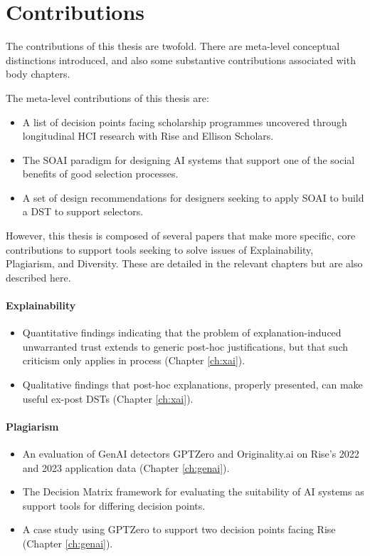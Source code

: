 \section{Contributions} 
The contributions of this thesis are twofold. There are meta-level conceptual distinctions introduced, and also some substantive contributions associated with body chapters.

The meta-level contributions of this thesis are:

\begin{itemize}
    \item A list of decision points facing scholarship programmes uncovered through longitudinal HCI research with Rise and Ellison Scholars.
    \item The SOAI paradigm for designing AI systems that support one of the social benefits of good selection processes.
    \item A set of design recommendations for designers seeking to apply SOAI to build a DST to support selectors.
\end{itemize}

However, this thesis is composed of several papers that make more specific, core contributions to support tools seeking to solve issues of Explainability, Plagiarism, and Diversity. These are detailed in the relevant chapters but are also described here.

\paragraph{Explainability}
\begin{itemize}
    \item Quantitative findings indicating that the problem of explanation-induced unwarranted trust extends to generic post-hoc justifications, but that such criticism only applies in process (Chapter \ref{ch:xai}).
    \item Qualitative findings that post-hoc explanations, properly presented, can make useful ex-post DSTs (Chapter \ref{ch:xai}).
\end{itemize}

\paragraph{Plagiarism}
\begin{itemize}
    \item An evaluation of GenAI detectors GPTZero and Originality.ai on Rise's 2022 and 2023 application data (Chapter \ref{ch:genai}).
    \item The Decision Matrix framework for evaluating the suitability of AI systems as support tools for differing decision points.
    \item A case study using GPTZero to support two decision points facing Rise (Chapter \ref{ch:genai}).
\end{itemize}

